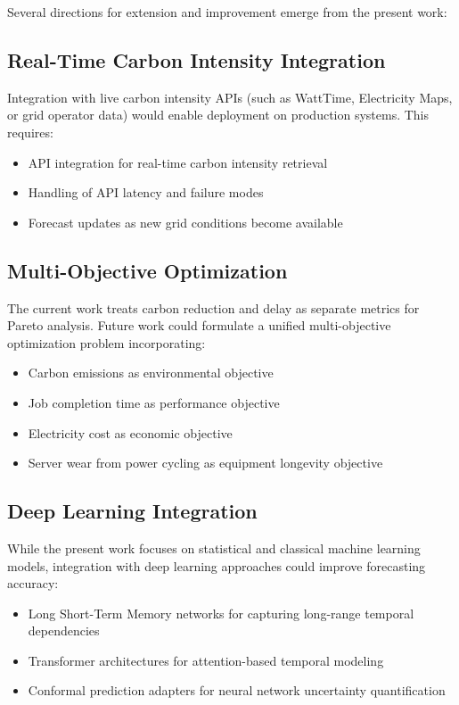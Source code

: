 \documentclass[12pt]{report}
\begin{document}
Several directions for extension and improvement emerge from the present work:

\subsection{Real-Time Carbon Intensity Integration}

Integration with live carbon intensity APIs (such as WattTime, Electricity Maps, or grid operator data) would enable deployment on production systems. This requires:

\begin{itemize}
    \item API integration for real-time carbon intensity retrieval
    \item Handling of API latency and failure modes
    \item Forecast updates as new grid conditions become available
\end{itemize}

\subsection{Multi-Objective Optimization}

The current work treats carbon reduction and delay as separate metrics for Pareto analysis. Future work could formulate a unified multi-objective optimization problem incorporating:

\begin{itemize}
    \item Carbon emissions as environmental objective
    \item Job completion time as performance objective
    \item Electricity cost as economic objective
    \item Server wear from power cycling as equipment longevity objective
\end{itemize}

\subsection{Deep Learning Integration}

While the present work focuses on statistical and classical machine learning models, integration with deep learning approaches could improve forecasting accuracy:

\begin{itemize}
    \item Long Short-Term Memory networks for capturing long-range temporal dependencies
    \item Transformer architectures for attention-based temporal modeling
    \item Conformal prediction adapters for neural network uncertainty quantification
\end{itemize}
\end{document}
